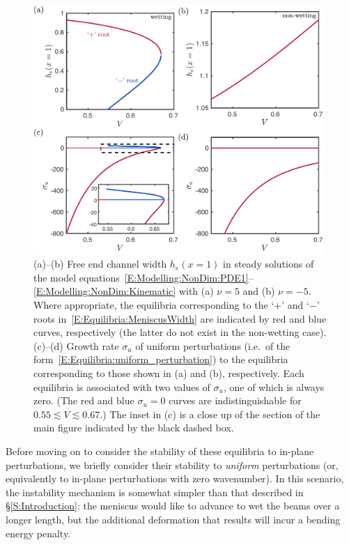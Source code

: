 \documentclass{jfm}
\begin{document}
\begin{figure}
\centering
\includegraphics[width =0.98\textwidth]{figures/fig5_equilibria.pdf}
\caption{(a)--(b) Free end channel width $h_e(x = 1)$ in steady solutions of the model equations~\eqref{E:Modelling:NonDim:PDE1}--\eqref{E:Modelling:NonDim:Kinematic} with (a) $\nu = 5$ and (b) $\nu = -5$. Where appropriate, the equilibria corresponding to the `$+$' and `$-$' roots in~\eqref{E:Equilibria:MeniscusWidth} are indicated by red and blue curves, respectively (the latter do not exist in the non-wetting case). (c)--(d) Growth rate $\sigma_u$ of uniform perturbations (i.e.~of the form~\eqref{E:Equilibria:uniform_perturbation}) to the equilibria corresponding to those shown in (a) and (b), respectively. Each equilibria is associated with two values of $\sigma_u$, one of which is always zero. (The red and blue $\sigma_u = 0$ curves are indistinguishable for $0.55 \lesssim V \lesssim 0.67$.) The inset in (c) is a close up of the section of the main figure indicated by the black dashed box.}\label{fig:Equilibria}
\end{figure}

Before moving on to consider the stability of these equilibria to in-plane perturbations, we briefly consider their stability to \textit{uniform} perturbations (or, equivalently to in-plane perturbations with zero wavenumber). In this scenario, the instability mechanism is somewhat simpler than that described in \S\ref{S:Introduction}: the meniscus would like to advance to wet the beams over a longer length, but the additional deformation that results will incur a bending energy penalty.
\end{document}
